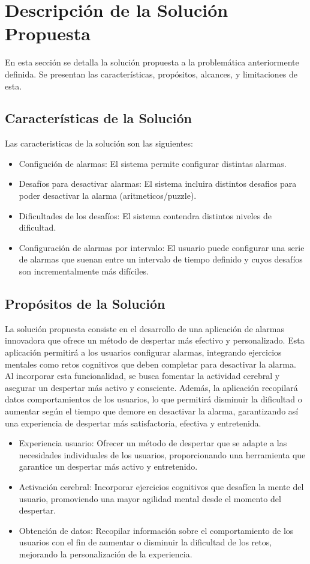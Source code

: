 \section{Descripción de la Solución Propuesta}
En esta sección se detalla la solución propuesta a la problemática anteriormente definida. Se presentan las características, propósitos, alcances, y limitaciones de esta.
\subsection{Características de la Solución}
Las caracteristicas de la solución son las siguientes:

\begin{itemize}
    \item Configución de alarmas: El sistema permite configurar distintas alarmas.
    \item Desafíos para desactivar alarmas: El sistema incluira distintos desafios para poder desactivar la alarma (aritmeticos/puzzle).
    \item Dificultades de los desafíos: El sistema contendra distintos niveles de dificultad.
    \item Configuración de alarmas por intervalo: El usuario puede configurar una serie de alarmas que suenan entre un intervalo de tiempo definido y cuyos desafíos son incrementalmente más difíciles.
\end{itemize}
\subsection{Propósitos de la Solución}
La solución propuesta consiste en el desarrollo de una aplicación de alarmas innovadora que ofrece un método de despertar más efectivo y personalizado. Esta aplicación permitirá a los usuarios configurar alarmas, integrando ejercicios mentales como retos cognitivos que deben completar para desactivar la alarma. Al incorporar esta funcionalidad, se busca fomentar la actividad cerebral y asegurar un despertar más activo y consciente. Además, la aplicación recopilará datos comportamientos de los usuarios, lo que permitirá disminuir la dificultad o aumentar según el tiempo que demore en desactivar la alarma, garantizando así una experiencia de despertar más satisfactoria, efectiva y entretenida.
 
\begin{itemize}
    \item Experiencia usuario: Ofrecer un método de despertar que se adapte a las necesidades individuales de los usuarios, proporcionando una herramienta que garantice un despertar más activo y entretenido.
    \item Activación cerebral: Incorporar ejercicios cognitivos que desafíen la mente del usuario, promoviendo una mayor agilidad mental desde el momento del despertar.
    \item Obtención de datos: Recopilar información sobre el comportamiento de los usuarios con el fin de aumentar o disminuir la dificultad de los retos, mejorando la personalización de la experiencia.
\end{itemize}


